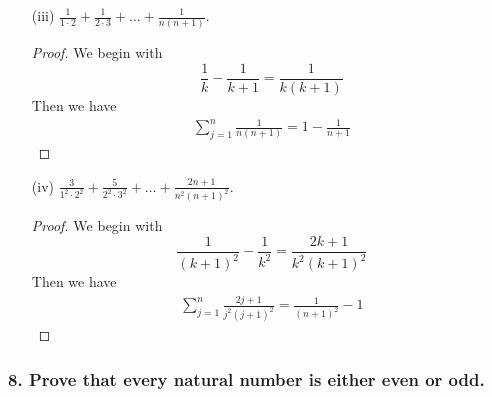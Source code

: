 \documentclass{article}
\begin{document}
\begin{enumerate}
\begin{proof}
\begin{align*}
		\end{align*}
	\end{proof}
	\item[(iii)] $\frac{1}{1 \cdot 2} + \frac{1}{2 \cdot 3} + \dots + \frac{1}{n(n + 1)}$.
	\begin{proof}
		We begin with \[ \frac{1}{k} - \frac{1}{k + 1} = \frac{1}{k(k+1)} \] Then we have
		\begin{align*}
			\sum_{j=1}^{n}\frac{1}{n(n + 1)} = 1 - \frac{1}{n + 1}
		\end{align*}
	\end{proof}
	\item[(iv)] $\frac{3}{1^2 \cdot 2^2} + \frac{5}{2^2 \cdot 3^2} + \dots + \frac{2n + 1}{n^2(n + 1)^2}$.
	\begin{proof}
		We begin with \[ \frac{1}{(k+1)^2} - \frac{1}{k^2} = \frac{2k+1}{k^2(k+1)^2} \] Then we have
		\begin{align*}
			\sum_{j=1}^{n}\frac{2j+1}{j^2(j+1)^2} = \frac{1}{(n + 1)^2} - 1
		\end{align*}
	\end{proof}
\end{enumerate}

\subsubsection*{8. Prove that every natural number is either even or odd.}
\end{document}
